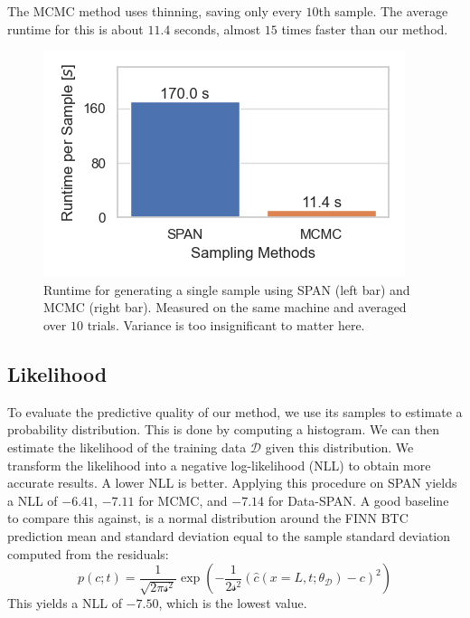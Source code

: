 The MCMC method uses thinning, saving only every $10$th sample. The average runtime for this is about $11.4$ seconds, almost $15$ times faster than our method.



\begin{figure}[h]
    \centering
    \includegraphics{figs/runtime_per_sample.png}
    \caption{Runtime for generating a single sample using SPAN (left bar) and MCMC (right bar). Measured on the same machine and averaged over $10$ trials. Variance is too insignificant to matter here.}
    \label{fig:runtime_per_sample}
\end{figure}

\subsection{Likelihood}
\label{sec:likelihood}
To evaluate the predictive quality of our method, we use its samples to estimate a probability distribution. This is done by computing a histogram. We can then estimate the likelihood of the training data $\mathcal{D}$ given this distribution. We transform the likelihood into a negative log-likelihood (NLL) to obtain more accurate results. A lower NLL is better. Applying this procedure on SPAN yields a NLL of $-6.41$, $-7.11$ for MCMC, and $-7.14$ for Data-SPAN. A good baseline to compare this against, is a normal distribution around the FINN BTC prediction mean and standard deviation equal to the sample standard deviation computed from the residuals:
\begin{equation*}
    p(c; t) = \frac{1}{\sqrt{2 \pi \mathcal{s}^2}} \exp(-\frac{1}{2 \mathcal{s}^2} (\hat{c}(x=L, t; \theta_{\mathcal{D}}) - c)^2)
\end{equation*}
This yields a NLL of $-7.50$, which is the lowest value. %

